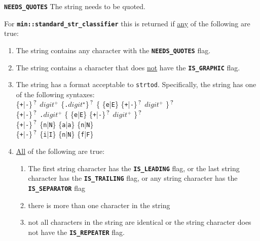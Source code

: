 \documentclass[12pt]{article}
\makeatletter
\newcommand{\TT}[1]{{\tt \bfseries #1}}
\newcommand{\STAR}{{\Large $^\star$}}
\newcommand{\PLUS}[1][]{{$^{+#1}$}}
\newcommand{\QMARK}{{$^{\,\mbox{\footnotesize ?}}$}}
\newcommand{\ttmkey}[2]{\TT{#1}\index{#1@{\tt #1}!#2}}
\newcommand{\EOL}{\penalty \exhyphenpenalty}
\newenvironment{itemlist}[1][1.2in]%
	{\begin{list}{}{\setlength{\labelwidth}{#1}%
		        \setlength{\leftmargin}{\labelwidth}%
		        \addtolength{\leftmargin}{+0.2in}%
		        \renewcommand{\makelabel}[1]{##1\hfill}}}%
	{\end{list}}
\makeatother
\begin{document}
\begin{itemlist}[1.5in]

\item[\ttmkey{NEEDS\_QUOTES}{{\tt min::str\_classifier} flag}]%
\label{NEEDS_QUOTES_CLASSIFIER}
The string needs to be quoted.

For \TT{min::\EOL standard\_\EOL str\_\EOL classifier} this is
returned if \underline{any} of the following are true:
\begin{enumerate}
\item
The string contains any character with the \TT{NEEDS\_\EOL QUOTES} flag.
\item
The string contains a character that does \underline{not} have the
\TT{IS\_\EOL GRAPHIC} flag.
\item
The string has a format acceptable to {\tt strtod}.  Specifically,
the string has one of the following syntaxes: \\
\hspace*{3em}\{{\tt +}|{\tt -}\}\QMARK{}
             $digit$\PLUS{} \{{\tt .}$digit$\STAR{}\}\QMARK{}
             \{ \{{\tt e}|{\tt E}\} \{{\tt +}|{\tt -}\}\QMARK{} $digit$\PLUS{}
	     \}\QMARK{} \\
\hspace*{3em}\{{\tt +}|{\tt -}\}\QMARK{}
              {\tt .}$digit$\PLUS{}
             \{ \{{\tt e}|{\tt E}\} \{{\tt +}|{\tt -}\}\QMARK{} $digit$\PLUS{}
	     \}\QMARK{} \\
\hspace*{3em}\{{\tt +}|{\tt -}\}\QMARK{}
             \{{\tt n}|{\tt N}\}
             \{{\tt a}|{\tt a}\}
             \{{\tt n}|{\tt N}\} \\
\hspace*{3em}\{{\tt +}|{\tt -}\}\QMARK{}
             \{{\tt i}|{\tt I}\}
             \{{\tt n}|{\tt N}\}
             \{{\tt f}|{\tt F}\}
\item
\underline{All} of the following are true:
\begin{enumerate}
\item The first string character has the \TT{IS\_\EOL LEADING} flag,
or the last string character has the \TT{IS\_\EOL TRAILING} flag,
or any string character has the \TT{IS\_\EOL SEPARATOR} flag
\item there is more than one character in the string
\item not all characters in the string are identical
or the string character does not have the \TT{IS\_\EOL REPEATER} flag.
\end{enumerate}
\end{enumerate}


\end{itemlist}
\end{document}
